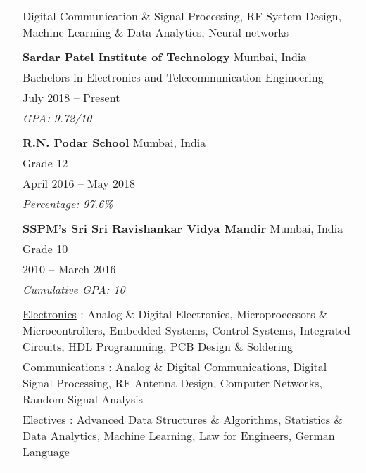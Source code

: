 \documentclass[letterpaper, 10pt]{article}
\begin{document}
\begin{longtable}{p{1.3in}p{4.8in}}


\nohyphens{\color{OliveGreen}{Research interests}}
& Digital Communication \& Signal Processing, RF System Design, Machine Learning \& Data Analytics, Neural networks \\
& \\


\color{OliveGreen}{Education} 
& \textbf{Sardar Patel Institute of Technology} \hfill Mumbai, India \\ 
& Bachelors in Electronics and Telecommunication Engineering \\
& July 2018 -- Present \\
& {\it GPA: 9.72/10}\\
& \\

& \textbf{R.N. Podar School} \hfill Mumbai, India \\
& Grade 12\\
& April 2016 -- May 2018\\
& {\it Percentage: 97.6\%}\\
& \\

& \textbf{SSPM's Sri Sri Ravishankar Vidya Mandir} \hfill Mumbai, India\\
& Grade 10 \\
& 2010 -- March 2016 \\
& {\it Cumulative GPA: 10}\\
& \\

\color{OliveGreen}{Coursework}
& \underline{Electronics} : Analog \& Digital Electronics, Microprocessors 
\& Microcontrollers, Embedded Systems, Control Systems, Integrated Circuits, HDL Programming, PCB Design \& Soldering \\

& \underline{Communications} : Analog \& Digital Communications, Digital Signal Processing, RF Antenna Design, Computer Networks, Random Signal Analysis \\

& \underline{Electives} : Advanced Data Structures \& Algorithms, Statistics \& Data Analytics, Machine Learning, Law for Engineers, German Language\\
 \\


\end{longtable}
\end{document}
